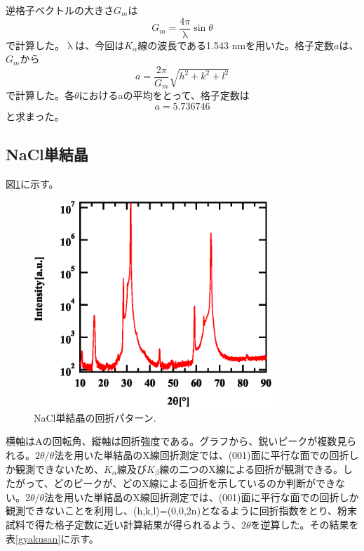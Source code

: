 \documentclass[11pt,a4j,uplatex]{jsarticle}
\begin{document}
\newpage
逆格子ベクトルの大きさ$G_{m}$は
\begin{equation}
 G_m=\frac{4\pi}{\uplambda}\sin\theta
 \label{gyakukousi}
\end{equation}
で計算した。$\uplambda$は、今回は$K_\alpha$線の波長である1.543 nmを用いた。格子定数$a$は、$G_{m}$から
\begin{equation}
 a=\frac{2\pi}{G_m}\sqrt{h^2+k^2+l^2}
 \label{kousiteisuu}
\end{equation}
で計算した。各$\theta$におけるaの平均をとって、格子定数は
\begin{equation}
 \nonumber
 a=5.736746
 \label{complete}
\end{equation}
と求まった。

\newpage
\subsection{NaCl単結晶}



図\ref{bulk}に示す。

\begin{figure}[htb]
 \centering
 \includegraphics[clip,width=9cm]{FigBulk.eps}
 \caption{NaCl単結晶の回折パターン.}
 \label{bulk}
\end{figure}

横軸はAの回転角、縦軸は回折強度である。グラフから、鋭いピークが複数見られる。$2\theta/\theta$法を用いた単結晶のX線回折測定では、(001)面に平行な面での回折しか観測できないため、$K_\alpha$線及び$K_\beta$線の二つのX線による回折が観測できる。したがって、どのピークが、どのX線による回折を示しているのか判断ができない。$2\theta/\theta$法を用いた単結晶のX線回折測定では、(001)面に平行な面での回折しか観測できないことを利用し、(h,k,l)=(0,0,2n)となるように回折指数をとり、粉末試料で得た格子定数に近い計算結果が得られるよう、$2\theta$を逆算した。その結果を表\ref{gyakusan}に示す。
\end{document}
